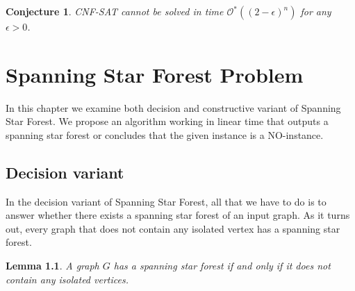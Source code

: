 \documentclass[en]{pracamgr}
\newtheorem{lemma}{Lemma}
\newtheorem{conjecture}{Conjecture}
\theoremstyle{definition}
\newcommand{\ssf}{spanning star forest}
\newcommand{\ssfp}{{\sc Spanning Star Forest}}
\newcommand{\cnfsat}{{\sc CNF-SAT}}
\begin{document}
\begin{conjecture}
	\cnfsat{} cannot be solved in time $\mathcal{O}^*((2-\epsilon)^n)$ for any $\epsilon>0$.
\end{conjecture}

\chapter{Spanning Star Forest Problem}\label{sec3}

In this chapter we examine both decision and constructive variant of \ssfp{}. We propose an algorithm working in linear time that outputs a \ssf{} or concludes that the given instance is a NO-instance.

\section{Decision variant}

In the decision variant of \ssfp{}, all that we have to do is to answer whether there exists a spanning star forest of an input graph. As it turns out, every graph that does not contain any isolated vertex has a \ssf{}.

\begin{lemma}\label{SSF lemma}
 A graph $G$ has a \ssf{} if and only if it does not contain any isolated vertices.
\end{lemma}
\end{document}
